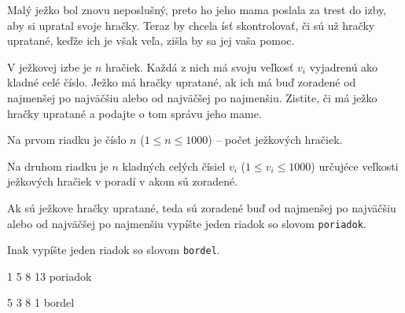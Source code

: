 




Malý ježko bol znovu neposlušný, preto ho jeho mama poslala za trest do izby, aby si upratal svoje
hračky. Teraz by chcela ísť skontrolovať, či sú už hračky upratané, keďže ich je však veľa, zišla by
sa jej vaša pomoc.


V ježkovej izbe je $n$ hračiek. Každá z nich má svoju veľkosť $v_i$ vyjadrenú ako kladné celé číslo.
Ježko má hračky upratané, ak ich má buď zoradené od najmenšej po najväčšiu alebo od najväčšej po
najmenšiu. Zistite, či má ježko hračky upratané a podajte o tom správu jeho mame.


Na prvom riadku je číslo $n$ ($1 \leq n \leq 1000$) -- počet ježkových hračiek.

Na druhom riadku je $n$ kladných celých čísiel $v_i$ ($1 \leq v_i \leq 1000$) určujéce veľkosti
ježkových hračiek v poradí v akom sú zoradené.


Ak sú ježkove hračky upratané, teda sú zoradené buď od najmenšej po najväčšiu alebo od najväčšej po
najmenšiu vypíšte jeden riadok so slovom \texttt{poriadok}.

Inak vypíšte jeden riadok so slovom \texttt{bordel}.


1 5 8 13
\vystup
poriadok
\koniec

5 3 8 1
\vystup
bordel
\koniec


